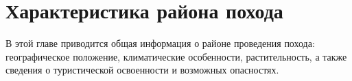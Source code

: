 \chapter{Характеристика района похода}
\label{ch:region}

В этой главе приводится общая информация о районе проведения похода: географическое положение, климатические особенности, растительность, а также сведения о туристической освоенности и возможных опасностях.

